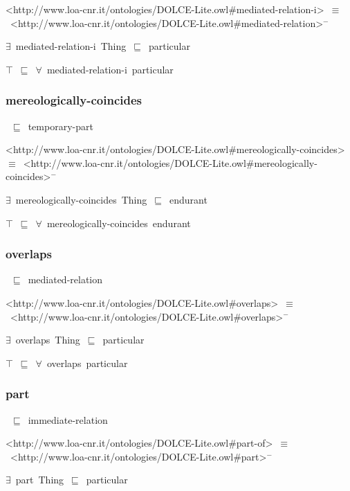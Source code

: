 \documentclass{article}
\begin{document}
<http://www.loa-cnr.it/ontologies/DOLCE-Lite.owl#mediated-relation-i>~\ensuremath{\equiv}~<http://www.loa-cnr.it/ontologies/DOLCE-Lite.owl#mediated-relation>\ensuremath{^-}

\ensuremath{\exists}~mediated-relation-i~Thing~\ensuremath{\sqsubseteq}~particular

\ensuremath{\top}~\ensuremath{\sqsubseteq}~\ensuremath{\forall}~mediated-relation-i~particular

\subsubsection*{mereologically-coincides}

~\ensuremath{\sqsubseteq}~temporary-part

<http://www.loa-cnr.it/ontologies/DOLCE-Lite.owl#mereologically-coincides>~\ensuremath{\equiv}~<http://www.loa-cnr.it/ontologies/DOLCE-Lite.owl#mereologically-coincides>\ensuremath{^-}

\ensuremath{\exists}~mereologically-coincides~Thing~\ensuremath{\sqsubseteq}~endurant

\ensuremath{\top}~\ensuremath{\sqsubseteq}~\ensuremath{\forall}~mereologically-coincides~endurant

\subsubsection*{overlaps}

~\ensuremath{\sqsubseteq}~mediated-relation

<http://www.loa-cnr.it/ontologies/DOLCE-Lite.owl#overlaps>~\ensuremath{\equiv}~<http://www.loa-cnr.it/ontologies/DOLCE-Lite.owl#overlaps>\ensuremath{^-}

\ensuremath{\exists}~overlaps~Thing~\ensuremath{\sqsubseteq}~particular

\ensuremath{\top}~\ensuremath{\sqsubseteq}~\ensuremath{\forall}~overlaps~particular

\subsubsection*{part}

~\ensuremath{\sqsubseteq}~immediate-relation

<http://www.loa-cnr.it/ontologies/DOLCE-Lite.owl#part-of>~\ensuremath{\equiv}~<http://www.loa-cnr.it/ontologies/DOLCE-Lite.owl#part>\ensuremath{^-}



\ensuremath{\exists}~part~Thing~\ensuremath{\sqsubseteq}~particular
\end{document}
